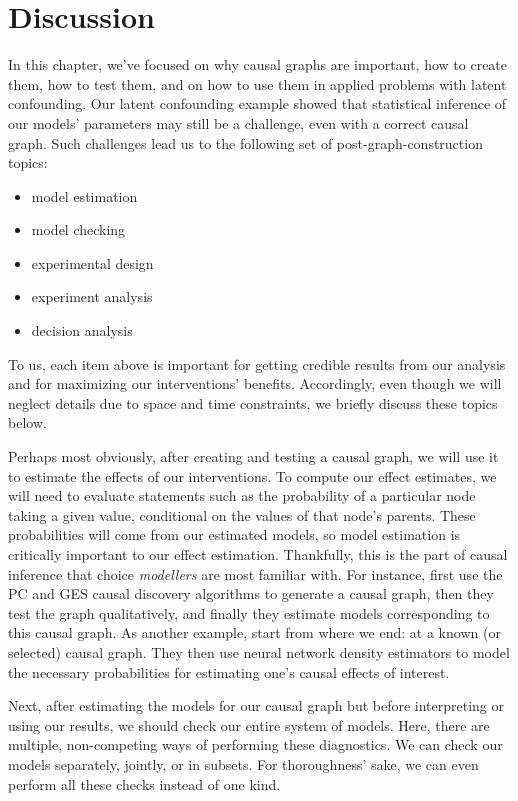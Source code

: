 \section{Discussion}
\label{sec:discussion}

In this chapter, we've focused on why causal graphs are important, how to create them, how to test them, and on how to use them in applied problems with latent confounding.
Our latent confounding example showed that statistical inference of our models' parameters may still be a challenge, even with a correct causal graph.
Such challenges lead us to the following set of post-graph-construction topics:
\begin{itemize}
   \item model estimation
   \item model checking
   \item experimental design
   \item experiment analysis
   \item decision analysis
\end{itemize}
To us, each item above is important for getting credible results from our analysis and for maximizing our interventions' benefits.
Accordingly, even though we will neglect details due to space and time constraints, we briefly discuss these topics below.

Perhaps most obviously, after creating and testing a causal graph, we will use it to estimate the effects of our interventions.
To compute our effect estimates, we will need to evaluate statements such as the probability of a particular node taking a given value, conditional on the values of that node's parents.
These probabilities will come from our estimated models, so model estimation is critically important to our effect estimation.
Thankfully, this is the part of causal inference that choice \textit{modellers} are most familiar with.
For instance, \citet{kostic_2020_uncovering} first use the PC and GES causal discovery algorithms to generate a causal graph, then they test the graph qualitatively, and finally they estimate models corresponding to this causal graph.
As another example, \citet{garrido_2020_estimating} start from where we end: at a known (or selected) causal graph.
They then use neural network density estimators to model the necessary probabilities for estimating one's causal effects of interest.

Next, after estimating the models for our causal graph but before interpreting or using our results, we should check our entire system of models.
Here, there are multiple, non-competing ways of performing these diagnostics.
We can check our models separately, jointly, or in subsets.
For thoroughness' sake, we can even perform all these checks instead of one kind.

